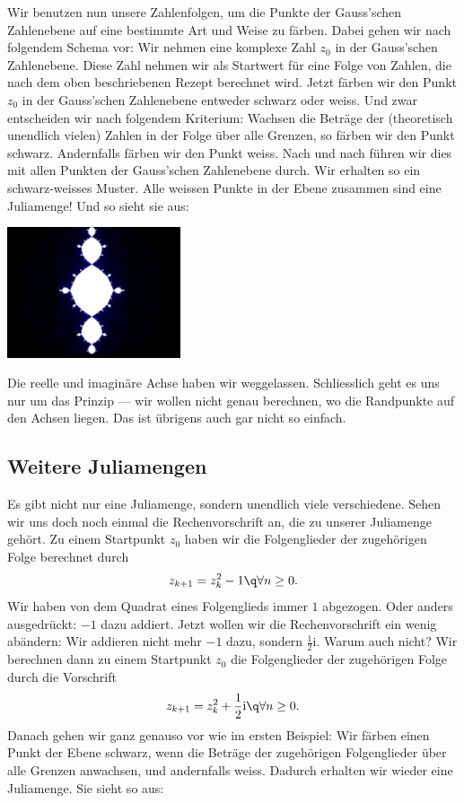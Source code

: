 \documentclass[%
11pt,%
twoside,%
titlepage,%
german,%
headsepline%
]{scrartcl}
\newcounter{theo}[section]\setcounter{theo}{0}
\begin{document}
Wir benutzen nun unsere Zahlenfolgen, um die Punkte der Gauss'schen Zahlenebene auf eine bestimmte Art und Weise zu färben. Dabei gehen wir nach folgendem Schema vor:
Wir nehmen eine komplexe Zahl $z_0$ in der Gauss'schen Zahlenebene. Diese Zahl nehmen wir als Startwert f\"ur eine Folge von Zahlen, die nach dem oben beschriebenen Rezept berechnet wird. Jetzt färben wir den Punkt $z_0$ in der Gauss'schen Zahlenebene entweder schwarz oder weiss. Und zwar entscheiden wir nach folgendem Kriterium:
Wachsen die Beträge der (theoretisch unendlich vielen) Zahlen in der Folge \"uber alle Grenzen, so färben wir den Punkt schwarz. Andernfalls färben wir den Punkt weiss.
Nach und nach f\"uhren wir dies mit allen Punkten der Gauss'schen Zahlenebene durch. Wir erhalten so ein schwarz-weisses Muster. Alle weissen Punkte in der Ebene zusammen sind eine Juliamenge! Und so sieht sie aus:

\begin{center}
\includegraphics[width=0.382\textwidth, angle= 90]{pictures/julia2}
\end{center}

Die reelle und imaginäre Achse haben wir weggelassen. Schliesslich geht es uns nur um das Prinzip --- wir wollen nicht genau berechnen, wo die Randpunkte auf den Achsen liegen. Das ist \"ubrigens auch gar nicht so einfach.

\subsection{Weitere Juliamengen}

Es gibt nicht nur eine Juliamenge, sondern unendlich viele verschiedene.
Sehen wir uns doch noch einmal die Rechenvorschrift an, die zu unserer Juliamenge geh\"ort. Zu einem Startpunkt $z_0$ haben wir die Folgenglieder der zugeh\"origen Folge berechnet durch
$$z_{k+1}=z_k^2-1\q\forall n\geq0.$$
Wir haben von dem Quadrat eines Folgenglieds immer $1$ abgezogen. Oder anders
ausgedr\"uckt: $-1$ dazu addiert.
Jetzt wollen wir die Rechenvorschrift ein wenig abändern: Wir addieren nicht
mehr $-1$ dazu, sondern $\frac{1}{2}\mathrm{i}$. Warum auch nicht? Wir berechnen dann zu einem Startpunkt $z_0$ die Folgenglieder der zugeh\"origen Folge durch die Vorschrift
$$z_{k+1}=z_k^2+\frac{1}{2}\mathrm{i}\q\forall n\geq0.$$
Danach gehen wir ganz genauso vor wie im ersten Beispiel: Wir färben einen Punkt der Ebene schwarz, wenn die Beträge der zugeh\"origen Folgenglieder \"uber alle Grenzen anwachsen, und andernfalls weiss. Dadurch erhalten wir wieder eine Juliamenge. Sie sieht so aus:
\end{document}
